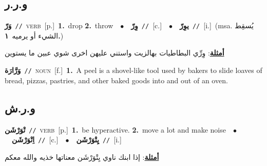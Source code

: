 \documentclass[10pt,a4paper,twoside]{article} %
\begin{document}
\begin{multicols}{2}
\vspace{-3mm}
\subsection*{\color{blue}\foreignlanguage{arabic}{و.ر.ر}\color{blue}{}} 

{\setlength\topsep{0pt}\textbf{\foreignlanguage{arabic}{وَرّ}}\ {\color{gray}\texttt{//}\color{black}}\ \textsc{verb}\ [p.]\ \textbf{1.}~drop  \textbf{2.}~throw\ \ $\bullet$\ \ \setlength\topsep{0pt}\textbf{\foreignlanguage{arabic}{وِرّ}}\ {\color{gray}\texttt{//}\color{black}}\ [c.]\ \ $\bullet$\ \ \setlength\topsep{0pt}\textbf{\foreignlanguage{arabic}{يوِرّ}}\ {\color{gray}\texttt{//}\color{black}}\ [i.]\ \color{gray}(msa. \foreignlanguage{arabic}{يُسقِط الشيء أو يرميه}~\foreignlanguage{arabic}{\textbf{١.}})\color{black}\  \begin{flushright}\color{gray}\foreignlanguage{arabic}{\textbf{\underline{\foreignlanguage{arabic}{أمثلة}}}: وِرِّي البطاطيات بهالزيت واستني عليهن اخرى شوي عبين ما يستوين}\end{flushright}\color{black}} \vspace{2mm}

{\setlength\topsep{0pt}\textbf{\foreignlanguage{arabic}{وَرَّارَة}}\ {\color{gray}\texttt{//}\color{black}}\ \textsc{noun}\ [f.]\ \textbf{1.}~A peel is a shovel-like tool used by bakers to slide loaves of bread, pizzas, pastries, and other baked goods into and out of an oven.\ } \vspace{2mm}

\vspace{-3mm}
\subsection*{\color{blue}\foreignlanguage{arabic}{و.ر.ش}\color{blue}{}} 

{\setlength\topsep{0pt}\textbf{\foreignlanguage{arabic}{تْوَرْشَن}}\ {\color{gray}\texttt{//}\color{black}}\ \textsc{verb}\ [p.]\ \textbf{1.}~be hyperactive.  \textbf{2.}~move a lot and make noise\ \ $\bullet$\ \ \setlength\topsep{0pt}\textbf{\foreignlanguage{arabic}{اِتْوَرْشَن}}\ {\color{gray}\texttt{//}\color{black}}\ [c.]\ \ $\bullet$\ \ \setlength\topsep{0pt}\textbf{\foreignlanguage{arabic}{يِتْوَرْشَن}}\ {\color{gray}\texttt{//}\color{black}}\ [i.]\  \begin{flushright}\color{gray}\foreignlanguage{arabic}{\textbf{\underline{\foreignlanguage{arabic}{أمثلة}}}: إذا ابنك ناوي يِتْوَرْشَن معناتها خذيه والله معكم}\end{flushright}\color{black}} \vspace{2mm}


\end{multicols}
\end{document}
